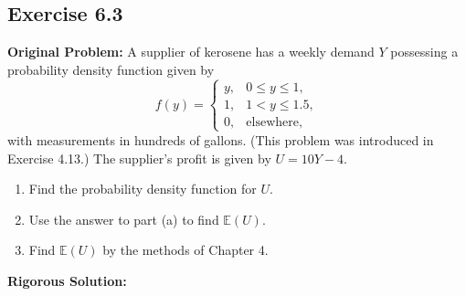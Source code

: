 \documentclass[11pt, letterpaper]{article}
\theoremstyle{definition}
\theoremstyle{remark}
\newcommand{\E}{\mathbb{E}}
\begin{document}
\subsection{Exercise 6.3}

\textbf{Original Problem:}
A supplier of kerosene has a weekly demand $Y$ possessing a probability density function given by
\[
    f(y) = \begin{cases} y, & 0 \le y \le 1, \\ 1, & 1 < y \le 1.5, \\ 0, & \text{elsewhere,} \end{cases}
\]
with measurements in hundreds of gallons. (This problem was introduced in Exercise 4.13.) The supplier's profit is given by $U = 10Y - 4$.
\begin{enumerate}[label=\textbf{\alph*}]
    \item Find the probability density function for $U$.
    \item Use the answer to part (a) to find $\E(U)$.
    \item Find $\E(U)$ by the methods of Chapter 4.
\end{enumerate}

\hrulefill

\textbf{Rigorous Solution:}
\end{document}
